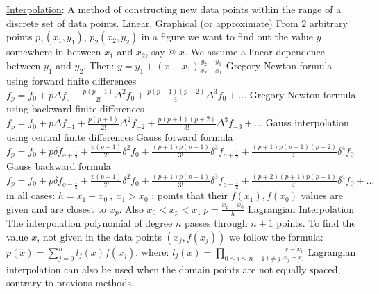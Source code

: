 \documentclass[12pt]{article}
\begin{document}
\begin{flushleft}
	\uline{Interpolation}: A method of constructing new data points within the range of a discrete set of data points. \linebreak 
	\textbullet \quad Linear, Graphical (or approximate) \linebreak 
	From $2$ arbitrary points $p_1(x_1, y_1)$, $p_2(x_2, y_2)$ in a figure we want to find out the value $y$ somewhere in between $x_1$ and $x_2$, say @ $x$. We assume a linear dependence between $y_1$ and $y_2$. Then: \linebreak 
	$\displaystyle y = y_1 + (x-x_1) \frac{y_2 - y_1}{x_2 - x_1} $ \linebreak 
	\textbullet \quad Gregory-Newton formula using forward finite differences \linebreak 
	$\displaystyle f_p = f_0 + p \Delta f_0 + \frac{p (p-1)}{2!} \Delta^2 f_0 + \frac{p(p-1)(p-2)}{3!} \Delta^3 f_0 + \ldots $ \linebreak 
	\textbullet \quad Gregory-Newton formula using backward finite differences \linebreak 
	$\displaystyle f_p = f_0 + p \Delta f_{-1} + \frac{p(p+1)}{2!} \Delta^2 f_{-2} + \frac{p(p+1)(p+2)}{3!} \Delta^3 f_{-3} + \ldots$ \linebreak 
	Gauss interpolation using central finite differences \linebreak 
	\textbullet \quad Gauss forward formula \linebreak 
	$\displaystyle f_p = f_0 + p \delta f_{o+\frac{1}{2}} + \frac{p(p-1)}{2!} \delta^2 f_0 + \frac{(p+1)p(p-1)}{3!} \delta^3 f_{o+\frac{1}{2}} + \frac{(p+1)p(p-1)(p-2)}{4!} \delta^4 f_0$ \linebreak 
	\textbullet \quad Gauss backward formula \linebreak 
	$\displaystyle f_p = f_0 + p \delta f_{o-\frac{1}{2}} + \frac{p(p+1)}{2!} \delta^2 f_0 + \frac{(p+1)p(p-1)}{3!} \delta^3 f_{o-\frac{1}{2}} + \frac{(p+2)(p+1)p(p-1)}{4!} \delta^4 f_0 + \ldots $ \linebreak 
	in all cases: $\displaystyle h= x_1 -x_0\ , \ x_1 > x_0$  :  points that their $f(x_1), f(x_0)$ values are given and are closest to $x_p$. Also $\displaystyle x_0 < x_p < x_1 \ p = \frac{x_p - x_0}{h} $ \linebreak 
	\textbullet \quad Lagrangian Interpolation \linebreak 
	The interpolation polynomial of degree $n$ passes through $n+1$ points. To find the value $x$, not given in the data points $(x_j, f(x_j))$ we follow the formula: $\displaystyle p(x) = \sum_{j=0}^n l_j(x) f(x_j)$, where: $\displaystyle l_j(x) = \prod\limits_{0\leq i \leq n-1 \ i \neq j} \frac{x-x_i}{x_j-x_i}$ \linebreak 
	Lagrangian interpolation can also be used when the domain points are not equally spaced, sontrary to previous methods. \linebreak 	
	

\end{flushleft}
\end{document}
